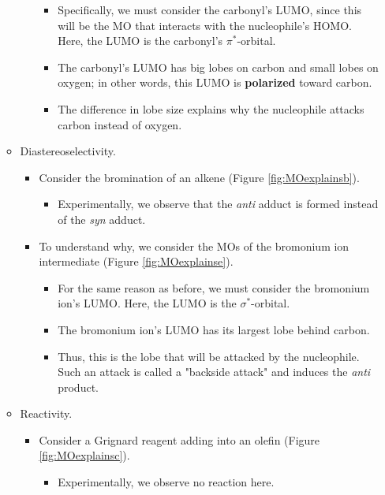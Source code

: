 \documentclass[../notes.tex]{subfiles}
\begin{document}
\begin{itemize}
\begin{itemize}
\begin{itemize}
            \begin{itemize}
                \item Specifically, we must consider the carbonyl's LUMO, since this will be the MO that interacts with the nucleophile's HOMO. Here, the LUMO is the carbonyl's $\pi^*$-orbital.
                \item The carbonyl's LUMO has big lobes on carbon and small lobes on oxygen; in other words, this LUMO is \textbf{polarized} toward carbon.
                \item The difference in lobe size explains why the nucleophile attacks carbon instead of oxygen.
            \end{itemize}
        \end{itemize}
        \item Diastereoselectivity.
        \begin{itemize}
            \item Consider the bromination of an alkene (Figure \ref{fig:MOexplainsb}).
            \begin{itemize}
                \item Experimentally, we observe that the \emph{anti} adduct is formed instead of the \emph{syn} adduct.
            \end{itemize}
            \item To understand why, we consider the MOs of the bromonium ion intermediate (Figure \ref{fig:MOexplainse}).
            \begin{itemize}
                \item For the same reason as before, we must consider the bromonium ion's LUMO. Here, the LUMO is the  $\sigma^*$-orbital.
                \item The bromonium ion's LUMO has its largest lobe behind carbon.
                \item Thus, this is the lobe that will be attacked by the  nucleophile. Such an attack is called a "backside attack" and induces the \emph{anti} product.
            \end{itemize}
        \end{itemize}
        \item Reactivity.
        \begin{itemize}
            \item Consider a Grignard reagent adding into an olefin (Figure \ref{fig:MOexplainsc}).
            \begin{itemize}
                \item Experimentally, we observe no reaction here.

\end{itemize}
\end{itemize}
\end{itemize}
\end{itemize}
\end{document}
